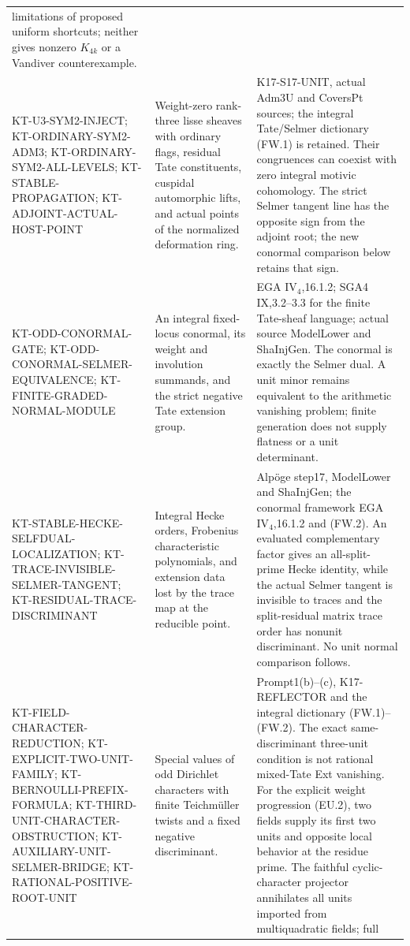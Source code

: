 \documentclass[11pt,a4paper]{article}
\theoremstyle{definition}
\begin{document}
\begin{longtable}{>{\raggedright\arraybackslash}p{}
>{\raggedright\arraybackslash}p{}
>{\raggedright\arraybackslash}p{}}
limitations of proposed uniform shortcuts; neither gives
nonzero $K_{4k}$ or a Vandiver counterexample.\\
KT-U3-SYM2-INJECT; KT-ORDINARY-SYM2-ADM3;
KT-ORDINARY-SYM2-ALL-LEVELS;
KT-STABLE-PROPAGATION; KT-ADJOINT-ACTUAL-HOST-POINT &
Weight-zero rank-three lisse sheaves with ordinary flags,
residual Tate constituents, cuspidal automorphic lifts, and
actual points of the normalized deformation ring. &
K17-S17-UNIT, actual Adm3U and CoversPt sources; the integral
Tate/Selmer dictionary (FW.1) is retained. Their congruences
can coexist with zero integral motivic cohomology. The strict
Selmer tangent line has the opposite sign from the adjoint
root; the new conormal comparison below retains that sign.\\
KT-ODD-CONORMAL-GATE; KT-ODD-CONORMAL-SELMER-EQUIVALENCE;
KT-FINITE-GRADED-NORMAL-MODULE &
An integral fixed-locus conormal, its weight and involution
summands, and the strict negative Tate extension group. &
EGA IV$_4$,16.1.2; SGA4 IX,3.2--3.3 for the finite Tate-sheaf
language; actual source ModelLower and ShaInjGen.
The conormal is exactly the Selmer dual. A unit minor remains
equivalent to the arithmetic vanishing problem; finite
generation does not supply flatness or a unit determinant.\\
KT-STABLE-HECKE-SELFDUAL-LOCALIZATION;
KT-TRACE-INVISIBLE-SELMER-TANGENT;
KT-RESIDUAL-TRACE-DISCRIMINANT &
Integral Hecke orders, Frobenius characteristic polynomials,
and extension data lost by the trace map at the reducible point. &
Alp\"oge step17, ModelLower and ShaInjGen; the conormal
framework EGA IV$_4$,16.1.2 and (FW.2).
An evaluated complementary factor gives an all-split-prime
Hecke identity, while the actual Selmer tangent is invisible
to traces and the split-residual matrix trace order has
nonunit discriminant. No unit normal comparison follows.\\
KT-FIELD-CHARACTER-REDUCTION; KT-EXPLICIT-TWO-UNIT-FAMILY;
KT-BERNOULLI-PREFIX-FORMULA; KT-THIRD-UNIT-CHARACTER-OBSTRUCTION;
KT-AUXILIARY-UNIT-SELMER-BRIDGE; KT-RATIONAL-POSITIVE-ROOT-UNIT &
Special values of odd Dirichlet characters with finite
Teichm\"uller twists and a fixed negative discriminant. &
Prompt1(b)--(c), K17-REFLECTOR and the integral dictionary
(FW.1)--(FW.2). The exact same-discriminant three-unit
condition is not rational mixed-Tate Ext vanishing.
For the explicit weight progression (EU.2), two fields
supply its first two units and opposite local behavior
at the residue prime. The faithful cyclic-character projector
annihilates all units imported from multiquadratic fields; full

\end{longtable}
\end{document}
